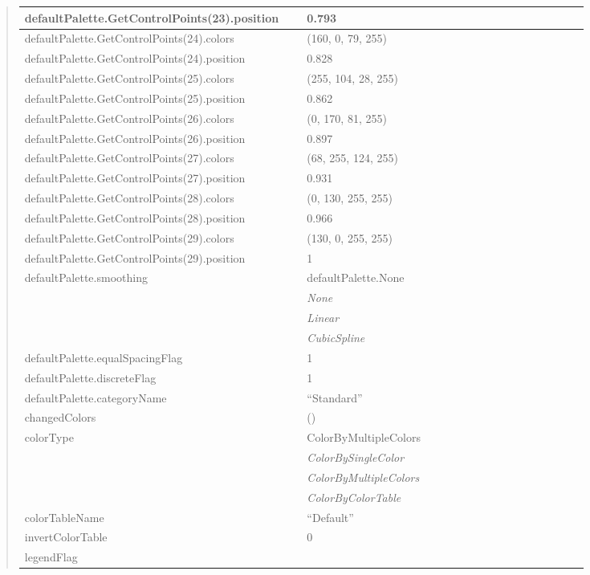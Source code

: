\documentclass[letterpaper,10pt,english]{sphinxmanual}
\begin{document}
\begin{quote}
\begin{longtable}{|p{0.475\linewidth}|p{0.475\linewidth}|}
\\
\hline
defaultPalette.GetControlPoints(23).position
 & 
0.793
\\
\hline
defaultPalette.GetControlPoints(24).colors
 & 
(160, 0, 79, 255)
\\
\hline
defaultPalette.GetControlPoints(24).position
 & 
0.828
\\
\hline
defaultPalette.GetControlPoints(25).colors
 & 
(255, 104, 28, 255)
\\
\hline
defaultPalette.GetControlPoints(25).position
 & 
0.862
\\
\hline
defaultPalette.GetControlPoints(26).colors
 & 
(0, 170, 81, 255)
\\
\hline
defaultPalette.GetControlPoints(26).position
 & 
0.897
\\
\hline
defaultPalette.GetControlPoints(27).colors
 & 
(68, 255, 124, 255)
\\
\hline
defaultPalette.GetControlPoints(27).position
 & 
0.931
\\
\hline
defaultPalette.GetControlPoints(28).colors
 & 
(0, 130, 255, 255)
\\
\hline
defaultPalette.GetControlPoints(28).position
 & 
0.966
\\
\hline
defaultPalette.GetControlPoints(29).colors
 & 
(130, 0, 255, 255)
\\
\hline
defaultPalette.GetControlPoints(29).position
 & 
1
\\
\hline
defaultPalette.smoothing
 & 
defaultPalette.None
\\
\hline & 
\emph{None}
\\
\hline & 
\emph{Linear}
\\
\hline & 
\emph{CubicSpline}
\\
\hline
defaultPalette.equalSpacingFlag
 & 
1
\\
\hline
defaultPalette.discreteFlag
 & 
1
\\
\hline
defaultPalette.categoryName
 & 
``Standard''
\\
\hline
changedColors
 & 
()
\\
\hline
colorType
 & 
ColorByMultipleColors
\\
\hline & 
\emph{ColorBySingleColor}
\\
\hline & 
\emph{ColorByMultipleColors}
\\
\hline & 
\emph{ColorByColorTable}
\\
\hline
colorTableName
 & 
``Default''
\\
\hline
invertColorTable
 & 
0
\\
\hline
legendFlag

\end{longtable}
\end{quote}
\end{document}

